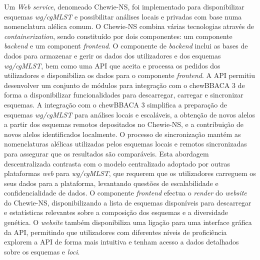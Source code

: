 Um \textit{Web service}, denomeado Chewie-NS, foi implementado para disponibilizar esquemas \textit{wg/cgMLST} e possibilitar análises locais e privadas com base numa nomenclatura alélica comum. O Chewie-NS combina várias tecnologias através de \textit{containerization}, sendo constituído por dois componentes: um componente \textit{backend} e um component \textit{frontend}. O componente de \textit{backend} inclui as bases de dados para armazenar e gerir os dados dos utilizadores e dos esquemas \textit{wg/cgMLST}, bem como uma API que aceita e processa os pedidos dos utilizadores e disponibiliza os dados para o componente \textit{frontend}. A API permitiu desenvolver um conjunto de módulos para integração com o chewBBACA 3 de forma a disponibilizar funcionalidades para descarregar, carregar e sincronizar esquemas. A integração com o chewBBACA 3 simplifica a preparação de esquemas \textit{wg/cgMLST} para análises locais e escaláveis, a obtenção de novos alelos a partir dos esquemas remotos depositados no Chewie-NS, e a contribuição de novos alelos identificados localmente. O processo de sincronização mantém as nomenclaturas alélicas utilizadas pelos esquemas locais e remotos sincronizadas para assegurar que os resultados são comparáveis. Esta abordagem descentralizada contrasta com o modelo centralizado adoptado por outras plataformas \textit{web} para \textit{wg/cgMLST}, que requerem que os utilizadores carreguem os seus dados para a plataforma, levantando questões de escalabilidade e confidencialidade de dados. O componente \textit{frontend} efectua o \textit{render} do \textit{website} do Chewie-NS, disponibilizando a lista de esquemas disponíveis para descarregar e estatísticas relevantes sobre a composição dos esquemas e a diversidade genética. O \textit{website} também disponibiliza uma ligação para uma interface gráfica da API, permitindo que utilizadores com diferentes níveis de proficiência explorem a API de forma mais intuitiva e tenham acesso a dados detalhados sobre os esquemas e \textit{loci}.

